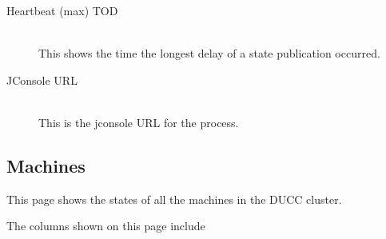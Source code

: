 \begin{description}
      \item[Heartbeat (max) TOD] \hfill \\ 
        This shows the time the longest delay of a state publication occurred.

      \item[JConsole URL] \hfill \\ 
        This is the jconsole URL for the process.

   \end{description}
      
\subsection{Machines}

This page shows the states of all the machines in the DUCC cluster.

The columns shown on this page include

